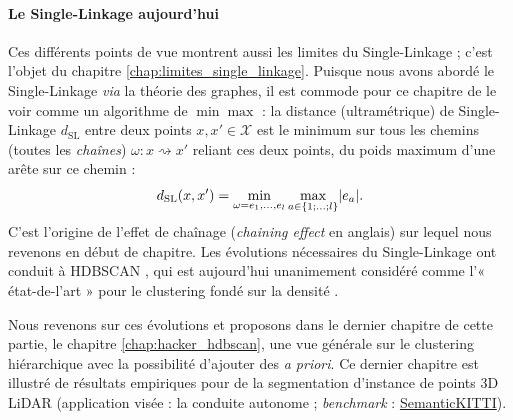 \documentclass{these-ISSS} %
\begin{document}
\paragraph{Le Single-Linkage aujourd'hui}
Ces différents points de vue montrent aussi les limites du Single-Linkage ; c'est l'objet du chapitre \ref{chap:limites_single_linkage}. Puisque nous avons abordé le Single-Linkage \emph{via} la théorie des graphes, il est commode pour ce chapitre de le voir comme un algorithme de $\min \max$ : la distance (ultramétrique) de Single-Linkage $d_{\mathrm{SL}}$ entre deux points $x,x' \in \mathcal X$ est le minimum sur tous les chemins (toutes les \emph{chaînes}) $\omega : x \rightsquigarrow x'$  reliant ces deux points, du poids maximum d'une arête sur ce chemin :
\[
d_{\mathrm{SL}}(x,x') = \min_{\omega = e_1,\ldots , e_l} \max_{a \in \{ 1 ; \ldots ; l\}} \lvert e_a \rvert.
\]
C'est l'origine de l'effet de chaînage (\emph{chaining effect} en anglais) sur lequel nous revenons en début de chapitre.
Les évolutions nécessaires du Single-Linkage ont conduit à HDBSCAN \cite{HDBSCAN, HDBSCAN2017}, qui est aujourd'hui unanimement considéré comme l'« état-de-l'art » pour le clustering fondé sur la densité \cite{HDBSCAN2025SOTA, FLASC2025}. 

Nous revenons sur ces évolutions et proposons dans le dernier chapitre de cette partie, le chapitre \ref{chap:hacker_hdbscan}, une vue générale sur le clustering hiérarchique avec la possibilité d'ajouter des \emph{a priori}. Ce dernier chapitre est illustré de résultats empiriques pour de la segmentation d'instance de points 3D LiDAR (application visée : la conduite autonome ; \emph{benchmark} : \href{https://semantic-kitti.org/}{SemanticKITTI}).





\end{document}
